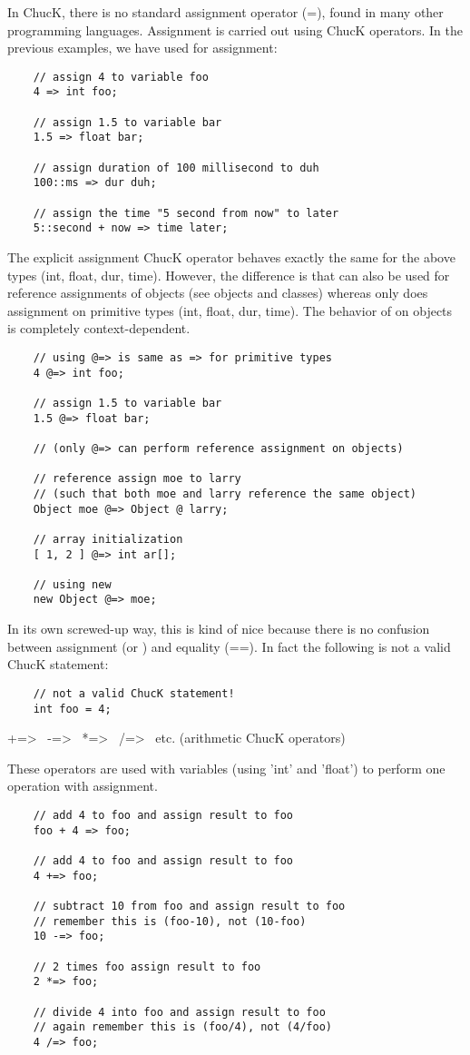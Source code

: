In ChucK, there is no standard assignment operator (=), found in many other programming languages. Assignment is carried out using ChucK operators. In the previous examples, we have used \chuckop for assignment:
\begin{verbatim}
    // assign 4 to variable foo
    4 => int foo;

    // assign 1.5 to variable bar
    1.5 => float bar;

    // assign duration of 100 millisecond to duh
    100::ms => dur duh;

    // assign the time "5 second from now" to later
    5::second + now => time later;
\end{verbatim}

The \atchuckop explicit assignment ChucK operator behaves exactly the same for the above types (int, float, dur, time). However, the difference is that \atchuckop can also be used for reference assignments of objects (see objects and classes) whereas \chuckop only does assignment on primitive types (int, float, dur, time). The behavior of \chuckop on objects is completely context-dependent.
\begin{verbatim}
    // using @=> is same as => for primitive types
    4 @=> int foo;

    // assign 1.5 to variable bar
    1.5 @=> float bar;

    // (only @=> can perform reference assignment on objects)

    // reference assign moe to larry
    // (such that both moe and larry reference the same object)
    Object moe @=> Object @ larry;

    // array initialization
    [ 1, 2 ] @=> int ar[];

    // using new
    new Object @=> moe;
\end{verbatim}

In its own screwed-up way, this is kind of nice because there is no confusion between assignment (\atchuckop or \chuckop) and equality (==). In fact the following is not a valid ChucK statement:
\begin{verbatim}
    // not a valid ChucK statement!
    int foo = 4;
\end{verbatim}


+=\textgreater~ -=\textgreater~ *=\textgreater~ /=\textgreater~ etc. (arithmetic ChucK operators)

These operators are used with variables (using 'int' and 'float') to perform one operation with assignment.
\begin{verbatim}
    // add 4 to foo and assign result to foo
    foo + 4 => foo;

    // add 4 to foo and assign result to foo
    4 +=> foo;

    // subtract 10 from foo and assign result to foo
    // remember this is (foo-10), not (10-foo)
    10 -=> foo;

    // 2 times foo assign result to foo
    2 *=> foo;

    // divide 4 into foo and assign result to foo
    // again remember this is (foo/4), not (4/foo)
    4 /=> foo;
\end{verbatim}

